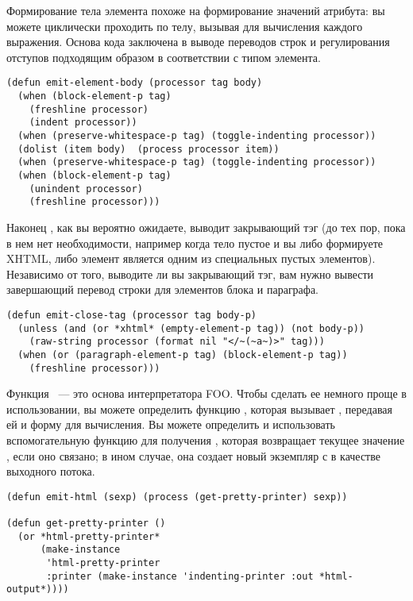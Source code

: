 Формирование тела элемента похоже на формирование значений атрибута: вы можете циклически
проходить по телу, вызывая  для вычисления каждого выражения. Основа кода
заключена в выводе переводов строк и регулирования отступов подходящим образом в
соответствии с типом элемента.

\begin{lstlisting}
(defun emit-element-body (processor tag body)
  (when (block-element-p tag)
    (freshline processor)
    (indent processor))
  (when (preserve-whitespace-p tag) (toggle-indenting processor))
  (dolist (item body)  (process processor item))
  (when (preserve-whitespace-p tag) (toggle-indenting processor))
  (when (block-element-p tag)
    (unindent processor)
    (freshline processor)))
\end{lstlisting}

Наконец , как вы вероятно ожидаете, выводит закрывающий тэг (до тех
пор, пока в нем нет необходимости, например когда тело пустое и вы либо формируете XHTML,
либо элемент является одним из специальных пустых элементов). Независимо от того, выводите
ли вы закрывающий тэг, вам нужно вывести завершающий перевод строки для элементов блока и
параграфа.

\begin{lstlisting}
(defun emit-close-tag (processor tag body-p)
  (unless (and (or *xhtml* (empty-element-p tag)) (not body-p))
    (raw-string processor (format nil "</~(~a~)>" tag)))
  (when (or (paragraph-element-p tag) (block-element-p tag))
    (freshline processor)))
\end{lstlisting}

Функция ~--- это основа интерпретатора FOO. Чтобы сделать ее немного проще в
использовании, вы можете определить функцию , которая вызывает
, передавая ей  и форму для вычисления. Вы можете
определить и использовать вспомогательную функцию  для получения
, которая возвращает текущее значение ,
если оно связано; в ином случае, она создает новый экземпляр  с
 в качестве выходного потока.

\begin{lstlisting}
(defun emit-html (sexp) (process (get-pretty-printer) sexp))

(defun get-pretty-printer ()
  (or *html-pretty-printer*
      (make-instance 
       'html-pretty-printer
       :printer (make-instance 'indenting-printer :out *html-output*))))
\end{lstlisting}

